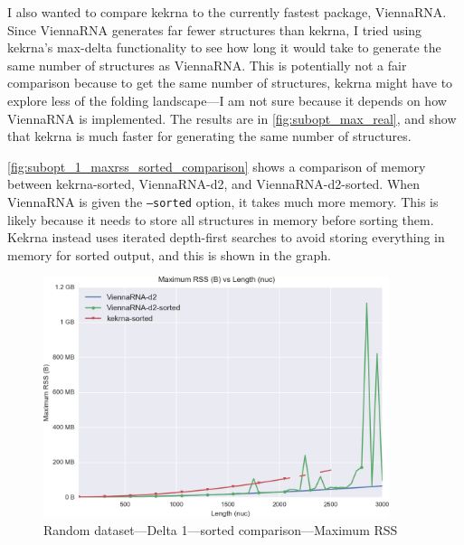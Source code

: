 \documentclass{cshonours}
\begin{document}
I also wanted to compare kekrna to the currently fastest package, ViennaRNA. Since ViennaRNA generates far fewer structures than kekrna, I tried using kekrna's max-delta functionality to see how long it would take to generate the same number of structures as ViennaRNA. This is potentially not a fair comparison because to get the same number of structures, kekrna might have to explore less of the folding landscape---I am not sure because it depends on how ViennaRNA is implemented. The results are in \autoref{fig:subopt_max_real}, and show that kekrna is much faster for generating the same number of structures.

\autoref{fig:subopt_1_maxrss_sorted_comparison} shows a comparison of memory between kekrna-sorted, ViennaRNA-d2, and ViennaRNA-d2-sorted. When ViennaRNA is given the \texttt{--sorted} option, it takes much more memory. This is likely because it needs to store all structures in memory before sorting them. Kekrna instead uses iterated depth-first searches to avoid storing everything in memory for sorted output, and this is shown in the graph. 


\begin{figure}[p]
\centering
\includegraphics[width=0.9\textwidth]{res/subopt_1_maxrss_sorted_comparison.png}
\caption{Random dataset---Delta 1---sorted comparison---Maximum RSS}
\label{fig:subopt_1_maxrss_sorted_comparison}
\end{figure}
\end{document}
